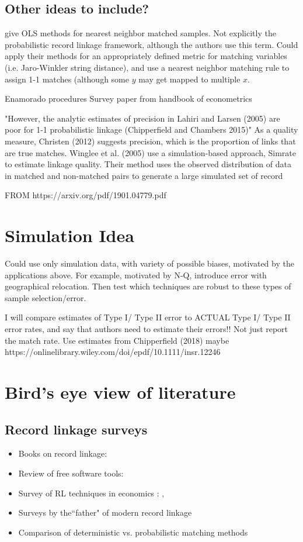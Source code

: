 \documentclass[12pt]{article}
\begin{document}
\subsection{Other ideas to include?}
\cite{hirukawa2018} give OLS methods for nearest neighbor matched samples.  Not explicitly the probabilistic record linkage framework, although the authors use this term. Could apply their methods for an appropriately defined metric for matching variables (i.e. Jaro-Winkler string distance), and use a nearest neighbor matching rule to assign 1-1 matches (although some $y$ may get mapped to multiple $x$. 


 Enamorado procedures
 Survey paper from handbook of econometrics
 
 "However, the analytic estimates of precision in Lahiri
and Larsen (2005) are poor for 1-1 probabilistic linkage (Chipperfield and Chambers
2015)"   As a quality measure, Christen (2012) suggests precision, which is the proportion of
links that are true matches. Winglee et al. (2005) use a simulation-based approach,
Simrate to estimate linkage quality. Their method uses the observed distribution of
data in matched and non-matched pairs to generate a large simulated set of record 

FROM https://arxiv.org/pdf/1901.04779.pdf
 

\section*{Simulation Idea}
Could use only simulation data, with variety of possible biases, motivated by the applications above.  For example, motivated by  N-Q, introduce error with geographical relocation.  Then test which techniques are robust to these types of sample selection/error.   

I will compare estimates of Type I/ Type II error to ACTUAL Type I/ Type II error rates, and say that authors need to estimate their errors!! Not just report the match rate.   Use estimates from Chipperfield (2018) maybe https://onlinelibrary.wiley.com/doi/epdf/10.1111/insr.12246

\newpage
\singlespacing
\section{Bird's eye view of literature}
\subsection*{Record linkage surveys}
\begin{itemize}
\item Books on record linkage: \cite{christen2012, herzog07}
\item Review of free software tools: \cite{kopcke2010}
\item Survey of RL techniques in economics : \cite{bailey2017}, \cite{abe2019} 
\item Surveys by the``father" of modern record linkage \citep{winkler99} 
\item Comparison of deterministic vs. probabilistic matching methods \citep{harron2018}
\end{itemize}
\end{document}
